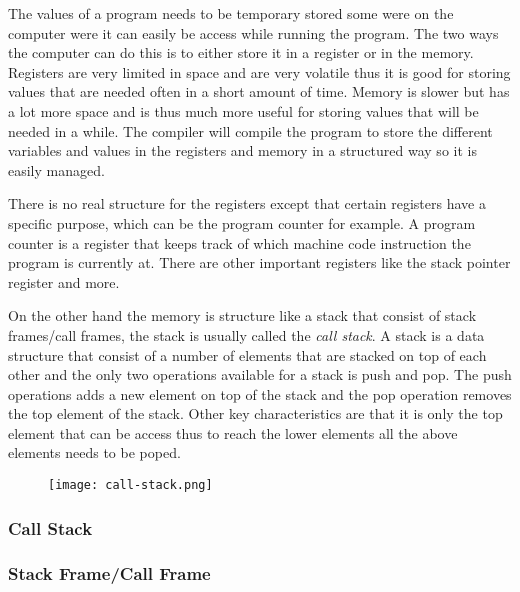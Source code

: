  

The values of a program needs to be temporary stored some were on the computer were it can easily be access while running the program.
The two ways the computer can do this is to either store it in a register or in the memory.
Registers are very limited in space and are very volatile thus it is good for storing values that are needed often in a short amount of time.
Memory is slower but has a lot more space and is thus much more useful for storing values that will be needed in a while.
The compiler will compile the program to store the different variables and values in the registers and memory in a structured way so it is easily managed.

There is no real structure for the registers except that certain registers have a specific purpose, which can be the program counter for example.
A program counter is a register that keeps track of which machine code instruction the program is currently at.
There are other important registers like the stack pointer register and more.

On the other hand the memory is structure like a stack that consist of stack frames/call frames, the stack is usually called the \emph{call stack}.
A stack is a data structure that consist of a number of elements that are stacked on top of each other and the only two operations available for a stack is push and pop.
The push operations adds a new element on top of the stack and the pop operation removes the top element of the stack.
Other key characteristics are that it is only the top element that can be access thus to reach the lower elements all the above elements needs to be poped.


\begin{figure}[h]
    \centering
    \texttt{[image: call-stack.png]}
    \label{fig:callstack}
\end{figure}


\subsubsection{Call Stack}


\subsubsection{Stack Frame/Call Frame}

